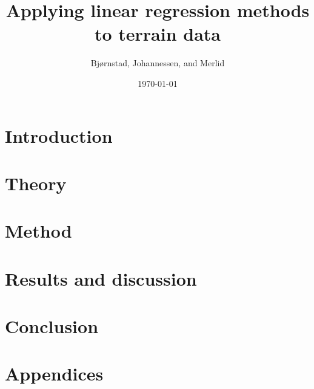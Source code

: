 \documentclass[aps,rmp,reprint,amsmath,amssymb,twocolumn,floatfix]{revtex4-1}
\begin{document}
\title{Applying linear regression methods to terrain data}

\author{Bjørnstad, Johannessen, and Merlid}
\date{\today}


\begin{abstract}

\end{abstract}
\maketitle

\tableofcontents

\section{Introduction}
\label{sec:introduction}

\section{Theory}


\section{Method}


\section{Results and discussion}


%

\section{Conclusion}


\newpage
{} %

\appendix
\section{Appendices}
\label{appendix}

\end{document}
